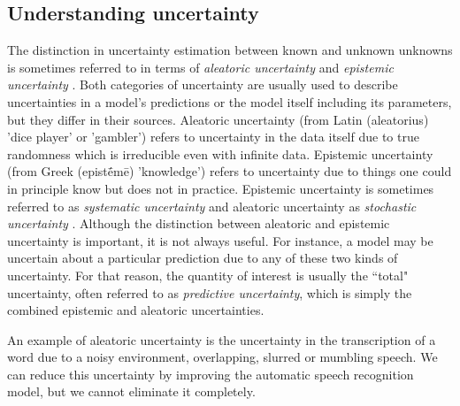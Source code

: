 \subsection{Understanding uncertainty}
% 
% 
%
The distinction in uncertainty estimation between known and unknown unknowns is sometimes referred to in terms of \textit{aleatoric uncertainty} and \textit{epistemic uncertainty} \cite{kendall_what_2017}. Both categories of uncertainty are usually used to describe uncertainties in a model's predictions or the model itself including its parameters, but they differ in their sources. 
Aleatoric uncertainty (from Latin (aleatorius) 'dice player' or 'gambler') refers to uncertainty in the data itself due to true randomness which is irreducible even with infinite data. 
Epistemic uncertainty (from Greek (epistḗmē) 'knowledge') refers to uncertainty due to things one could in principle know but does not in practice. 
Epistemic uncertainty is sometimes referred to as \textit{systematic uncertainty} and aleatoric uncertainty as \textit{stochastic uncertainty} \cite{kendall_what_2017}. 
Although the distinction between aleatoric and epistemic uncertainty is important, it is not always useful. For instance, a model may be uncertain about a particular prediction due to any of these two kinds of uncertainty. For that reason, the quantity of interest is usually the ``total" uncertainty, often referred to as \textit{predictive uncertainty}, which is simply the combined epistemic and aleatoric uncertainties. 

An example of aleatoric uncertainty is the uncertainty in the transcription of a word due to a noisy environment, overlapping, slurred or mumbling speech. We can reduce this uncertainty by improving the automatic speech recognition model, but we cannot eliminate it completely. 

